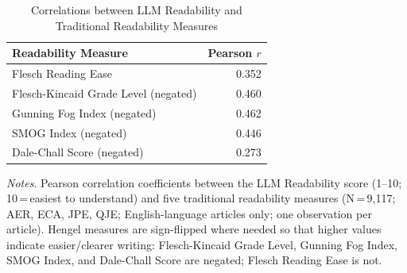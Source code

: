\begin{table}[htbp]
\centering
\begin{threeparttable}
\caption{Correlations between LLM Readability and Traditional Readability Measures}
\label{tab:readability_corr}
\begin{tabular}{lr}
\toprule
Readability Measure & Pearson $r$ \\
\midrule
Flesch Reading Ease & 0.352 \\
Flesch-Kincaid Grade Level (negated) & 0.460 \\
Gunning Fog Index (negated) & 0.462 \\
SMOG Index (negated) & 0.446 \\
Dale-Chall Score (negated) & 0.273 \\
\bottomrule
\end{tabular}
\begin{tablenotes}
\footnotesize
\item \textit{Notes}. Pearson correlation coefficients between the LLM Readability score (1--10; 10\,=\,easiest to understand) and five traditional readability measures (N\,=\,9,117; AER, ECA, JPE, QJE; English-language articles only; one observation per article). Hengel measures are sign-flipped where needed so that higher values indicate easier/clearer writing: Flesch-Kincaid Grade Level, Gunning Fog Index, SMOG Index, and Dale-Chall Score are negated; Flesch Reading Ease is not.
\end{tablenotes}
\end{threeparttable}
\end{table}
